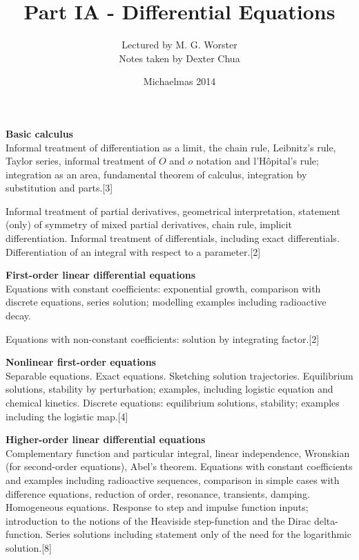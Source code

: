 \documentclass[a4paper]{article}
\title{Part IA - Differential Equations}
\author{Lectured by M. G. Worster\\\small Notes taken by Dexter Chua}
\date{Michaelmas 2014}
\begin{document}
\maketitle
{\small
  \noindent\textbf{Basic calculus}\\
  Informal treatment of differentiation as a limit, the chain rule, Leibnitz's rule, Taylor series, informal treatment of $O$ and $o$ notation and l'H\^opital’s rule; integration as an area, fundamental theorem of calculus, integration by substitution and parts.\hspace*{\fill}[3]

  \vspace{5pt}
  \noindent Informal treatment of partial derivatives, geometrical interpretation, statement (only) of symmetry of mixed partial derivatives, chain rule, implicit differentiation. Informal treatment of differentials, including exact differentials. Differentiation of an integral with respect to a parameter.\hspace*{\fill}[2]

  \vspace{10pt}
  \noindent\textbf{First-order linear differential equations}\\
  Equations with constant coefficients: exponential growth, comparison with discrete equations, series solution; modelling examples including radioactive decay.

  \vspace{5pt}
  \noindent Equations with non-constant coefficients: solution by integrating factor.\hspace*{\fill}[2]

  \vspace{10pt}
  \noindent\textbf{Nonlinear first-order equations}\\
  Separable equations. Exact equations. Sketching solution trajectories. Equilibrium solutions, stability by perturbation; examples, including logistic equation and chemical kinetics. Discrete equations: equilibrium solutions, stability; examples including the logistic map.\hspace*{\fill}[4]

  \vspace{10pt}
  \noindent\textbf{Higher-order linear differential equations}\\
  Complementary function and particular integral, linear independence, Wronskian (for second-order equations), Abel's theorem. Equations with constant coefficients and examples including radioactive sequences, comparison in simple cases with difference equations, reduction of order, resonance, transients, damping. Homogeneous equations. Response to step and impulse function inputs; introduction to the notions of the Heaviside step-function and the Dirac delta-function. Series solutions including statement only of the need for the logarithmic solution.\hspace*{\fill}[8]

}
\end{document}

